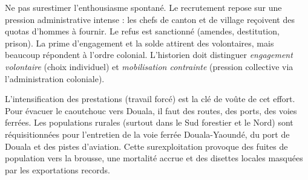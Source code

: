 \documentclass[11pt]{article}
\newcommand{\cle}[1]{{\popxbold\color{popdark}#1}}
\begin{document}
\begin{attention}
Ne pas surestimer l'enthousiasme spontané. Le recrutement repose sur une \cle{pression administrative} intense : les chefs de canton et de village reçoivent des \cle{quotas d'hommes} à fournir. Le refus est sanctionné (amendes, destitution, prison). La prime d'engagement et la solde attirent des volontaires, mais beaucoup répondent à l'ordre colonial. L'historien doit distinguer \emph{engagement volontaire} (choix individuel) et \emph{mobilisation contrainte} (pression collective via l'administration coloniale).
\end{attention}

L'intensification des \cle{prestations} (travail forcé) est la clé de voûte de cet effort. Pour évacuer le caoutchouc vers Douala, il faut des routes, des ports, des voies ferrées. Les populations rurales (surtout dans le Sud forestier et le Nord) sont réquisitionnées pour l'entretien de la voie ferrée Douala-Yaoundé, du port de Douala et des pistes d'aviation. Cette surexploitation provoque des fuites de population vers la brousse, une mortalité accrue et des disettes locales masquées par les exportations records.
\end{document}
